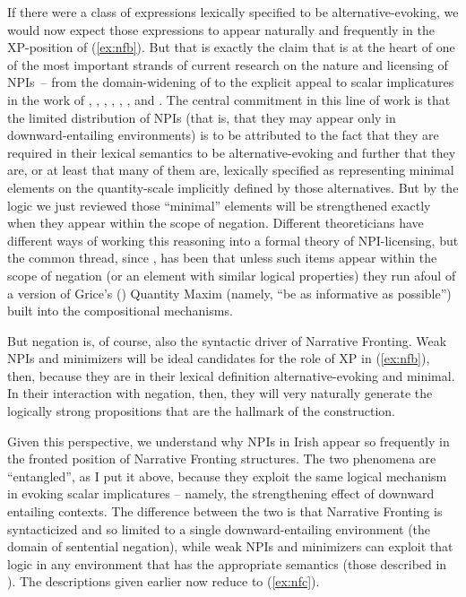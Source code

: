 \documentclass[output=paper,colorlinks,citecolor=brown]{langscibook}
\begin{document}
If there were a class of expressions lexically specified to be alternative-evoking, we would now expect those expressions to appear naturally and frequently in the XP-position of (\ref{ex:nfb}). But that is exactly the claim that is at the heart of one of the most important strands of current research on the nature and licensing of NPIs~-- from the domain-widening of \citet{kadmon-landman:93} to the explicit appeal to scalar implicatures in the work of \citet{krifka:95}, \citet{lee-horn:94}, \citet{israel:98}, \citet{lahiri:98}, \citet{horn:00}, \citet{condoravdi:08}, \citet{chierchia:13} and \citet{jeong-roelofsen:23}. The central commitment in this line of work is that the limited distribution of NPIs (that is, that they may appear only in downward-entailing environments) is to be attributed to the fact that they are required in their lexical semantics to be alternative-evoking and further that they are, or at least that many of them are, lexically specified as representing minimal elements on the quantity\hyp scale implicitly defined by those alternatives. But by the logic we just reviewed those “minimal” elements will be strengthened exactly when they appear within the scope of negation.  Different theoreticians have different ways of working this reasoning into a formal theory of NPI-licensing, but the common thread, since \citet{krifka:95}, has been that unless such items appear within the scope of negation (or an element with similar logical properties) they run afoul of a version of Grice's (\citeyear{grice:75}) Quantity Maxim (namely, “be as informative as possible”) built into the compositional mechanisms.

But negation is, of course, also the syntactic driver of Narrative Fronting. Weak NPIs and minimizers will be ideal candidates for the role of XP in (\ref{ex:nfb}), then, because they are in their lexical definition alternative-evoking and minimal.  In their interaction with negation, then, they will very naturally generate the logically strong propositions that are the hallmark of the construction.

Given this perspective, we understand why NPIs in Irish appear so frequently in the fronted position of Narrative Fronting structures. The two phenomena are “entangled”, as I put it above, because they exploit the same logical mechanism in evoking scalar implicatures -- namely, the strengthening effect of downward entailing contexts.  The difference between the two is that Narrative Fronting is syntacticized and so limited to a single downward-entailing environment (the domain of sentential negation), while weak NPIs and minimizers can exploit that logic in any environment that has the appropriate semantics (those described in ). The descriptions given earlier now reduce to (\ref{ex:nfc}).
\end{document}
